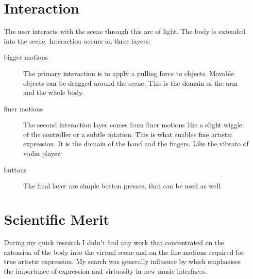 \documentclass[10pt,a4paper]{scrartcl}
\begin{document}
\section{Interaction}
The user interacts with the scene through this arc of light. The body is extended into the scene. Interaction occurs on three layers:

\begin{description}
\item[bigger motions] The primary interaction is to apply a pulling force to objects. Movable objects can be dragged around the scene. This is the domain of the arm and the whole body.

\item[finer motions] The second interaction layer comes from finer motions like a slight wiggle of the controller or a subtle rotation. This is what enables fine artistic expression. It is the domain of the hand and the fingers. Like the vibrato of violin player. 

\item[buttons] The final layer are simple button presses, that can be used as well.
\end{description}

\section{Scientific Merit}
During my quick research I didn't find any work that concentrated on the extension of the body into the virtual scene and on the fine motions required for true artistic expression. My search was generally influence by \cite{Dobrian2006} which emphasises the importance of expression and virtuosity in new music interfaces.



\end{document}
